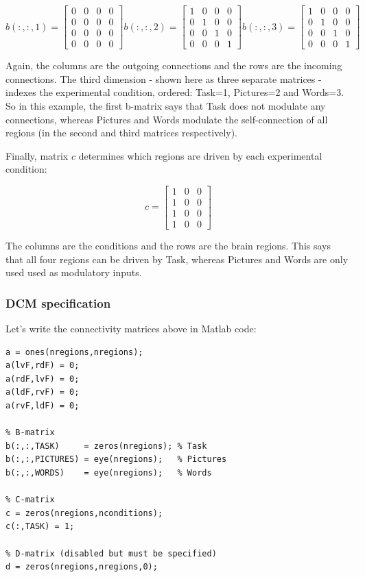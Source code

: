 \documentclass{article}
\begin{document}
\[
 b(:,:,1)=\begin{bmatrix}
  0 & 0 & 0 & 0 \\
  0 & 0 & 0 & 0 \\
  0 & 0 & 0 & 0 \\
  0 & 0 & 0 & 0
 \end{bmatrix} 
b(:,:,2)=\begin{bmatrix}
  1 & 0 & 0 & 0 \\
  0 & 1 & 0 & 0 \\
  0 & 0 & 1 & 0 \\
  0 & 0 & 0 & 1
 \end{bmatrix} 
b(:,:,3)=\begin{bmatrix}
  1 & 0 & 0 & 0 \\
  0 & 1 & 0 & 0 \\
  0 & 0 & 1 & 0 \\
  0 & 0 & 0 & 1
 \end{bmatrix}  
\]

Again, the columns are the outgoing connections and the rows are the incoming connections. The third dimension - shown here as three separate matrices - indexes the experimental condition, ordered: Task=1, Pictures=2 and Words=3. So in this example, the first b-matrix says that Task does not modulate any connections, whereas Pictures and Words modulate the self-connection of all regions (in the second and third matrices respectively). 

Finally, matrix \(c\) determines which regions are driven by each experimental condition:

\[
c=\begin{bmatrix}
  1 & 0 & 0 \\
  1 & 0 & 0 \\
  1 & 0 & 0 \\
  1 & 0 & 0
 \end{bmatrix} 
\]

The columns are the conditions and the rows are the brain regions. This says that all four regions can be driven by Task, whereas Pictures and Words are only used used as modulatory inputs.

\subsubsection{DCM specification}
Let's write the connectivity matrices above in Matlab code:

\begin{lstlisting}[style=Matlab-editor,caption=Connectivity matrices]
% A-matrix (on / off)
a = ones(nregions,nregions);
a(lvF,rdF) = 0;
a(rdF,lvF) = 0;
a(ldF,rvF) = 0;
a(rvF,ldF) = 0;

% B-matrix
b(:,:,TASK)     = zeros(nregions); % Task
b(:,:,PICTURES) = eye(nregions);   % Pictures
b(:,:,WORDS)    = eye(nregions);   % Words

% C-matrix
c = zeros(nregions,nconditions);
c(:,TASK) = 1;

% D-matrix (disabled but must be specified)
d = zeros(nregions,nregions,0);
\end{lstlisting}
\end{document}

